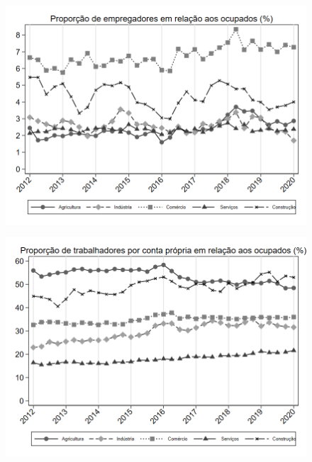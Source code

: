 \begin{frame}[label=_composicao_demografica_setor_prop_empregador]{}
\textit{\hyperlink{_composicao_demografica_setor}{}}
\begin{figure}
  \centering
  \includegraphics[width=1.0\linewidth]{../../analysis/output/composicao_demografica/setor/_composicao_demografica_setor_prop_empregador.png}
  \caption{}
  \label{fig:_composicao_demografica_setor_prop_empregador}
\end{figure}
\end{frame}



\begin{frame}[label=_composicao_demografica_setor_prop_cpropria]{}
\textit{\hyperlink{_composicao_demografica_setor}{}}
\begin{figure}
  \centering
  \includegraphics[width=1.0\linewidth]{../../analysis/output/composicao_demografica/setor/_composicao_demografica_setor_prop_cpropria.png}
  \caption{}
  \label{fig:_composicao_demografica_setor_prop_cpropria}
\end{figure}
\end{frame}

